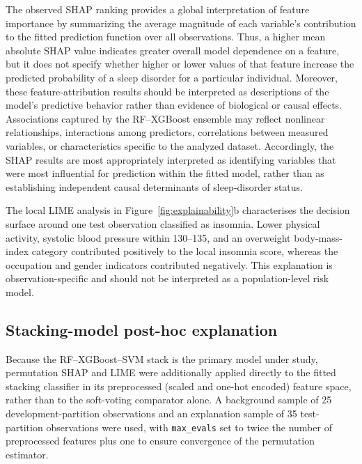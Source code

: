 \documentclass{elektr}
\begin{document}
The observed SHAP ranking provides a global interpretation of feature importance
by summarizing the average magnitude of each variable's contribution to the
fitted prediction function over all observations. Thus, a higher mean absolute
SHAP value indicates greater overall model dependence on a feature, but it does
not specify whether higher or lower values of that feature increase the predicted
probability of a sleep disorder for a particular individual. Moreover, these
feature-attribution results should be interpreted as descriptions of the model's
predictive behavior rather than evidence of biological or causal effects.
Associations captured by the RF--XGBoost ensemble may reflect nonlinear
relationships, interactions among predictors, correlations between measured
variables, or characteristics specific to the analyzed dataset. Accordingly,
the SHAP results are most appropriately interpreted as identifying variables
that were most influential for prediction within the fitted model, rather than
as establishing independent causal determinants of sleep-disorder status.

The local LIME analysis in Figure~\ref{fig:explainability}b characterises the decision surface around one test observation classified as insomnia. Lower physical activity, systolic blood pressure within 130--135, and an overweight body-mass-index category contributed positively to the local insomnia score, whereas the occupation and gender indicators contributed negatively. This explanation is observation-specific and should not be interpreted as a population-level risk model.

\subsection{Stacking-model post-hoc explanation}
\label{sec:stackpost}
Because the RF--XGBoost--SVM stack is the primary model under study, permutation SHAP and LIME were additionally applied directly to the fitted stacking classifier in its preprocessed (scaled and one-hot encoded) feature space, rather than to the soft-voting comparator alone. A background sample of 25 development-partition observations and an explanation sample of 35 test-partition observations were used, with \texttt{max\_evals} set to twice the number of preprocessed features plus one to ensure convergence of the permutation estimator.
\end{document}
